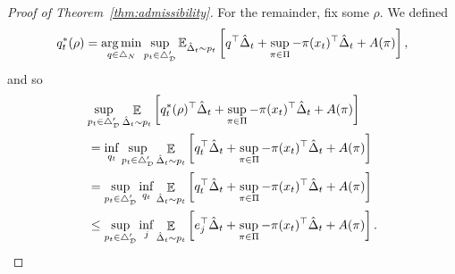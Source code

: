\documentclass{article}
\begin{document}
\begin{proof}[Proof of Theorem~\ref{thm:admissibility}]
For the remainder, fix some $\rho$. We defined
\[
  q_t^*(\rho)
  =
  \operatorname*{arg\,min}_{q \in \triangle_{N}}
  \sup_{p_t \in \triangle_{\mathcal D}'}
  \mathbb E_{\hat\Delta_t\sim p_t}\left[
  q^\top \hat \Delta_t
    +
    \sup_{\pi\in\Pi} -\pi(x_t)^\top \hat\Delta_t + A(\pi)\right],
  \]
  and so
  \begin{align*}
    &\lefteqn{\sup_{p_t\in\triangle_{\mathcal D}'} \mathop{\ex}_{\hat\Delta_t\sim p_t}\left[ q_t^*(\rho)^\top  \hat \Delta_t
    +
  \sup_{\pi\in\Pi} -\pi(x_t)^\top \hat\Delta_t + A(\pi)\right]}\\
    &=
      \inf_{q_t}
      \sup_{p_t\in\triangle_{\mathcal D}'} \mathop{\ex}_{\hat\Delta_t\sim p_t}\left[ q_t^\top  \hat \Delta_t
    +
      \sup_{\pi\in\Pi} -\pi(x_t)^\top \hat\Delta_t + A(\pi)\right]\\
      &=
    \sup_{p_t\in\triangle_{\mathcal D}'}
    \inf_{q_t}    
        \mathop{\ex}_{\hat\Delta_t\sim p_t}\left[ q_t^\top  \hat \Delta_t
    +
    \sup_{\pi\in\Pi} -\pi(x_t)^\top \hat\Delta_t + A(\pi)\right]\\
  &\leq
    \sup_{p_t\in\triangle_{\mathcal D}'}
    \inf_{j}  
    \mathop{\ex}_{\hat\Delta_t\sim p_t}\left[ e_j^\top  \hat \Delta_t
    +
    \sup_{\pi\in\Pi} -\pi(x_t)^\top \hat\Delta_t + A(\pi)\right].
  \end{align*}


\end{proof}
\end{document}
